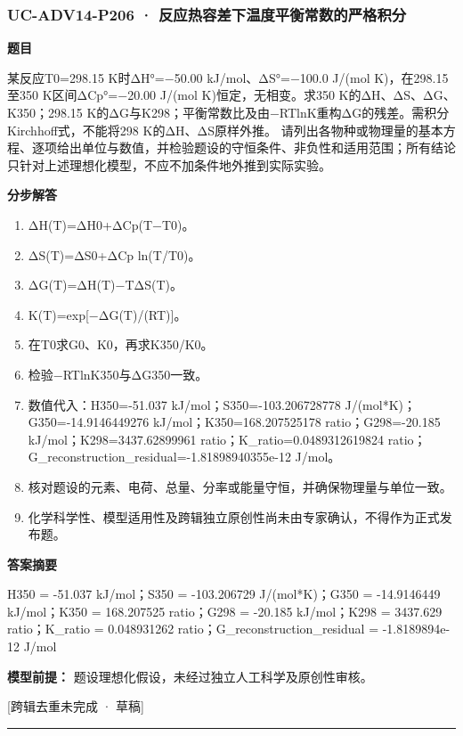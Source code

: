\documentclass[UTF8,11pt,a4paper]{ctexart}
\begin{document}
\subsubsection*{UC-ADV14-P206 · 反应热容差下温度平衡常数的严格积分}
\noindent\textbf{题目}\par
某反应T0=298.15 K时ΔH°=−50.00 kJ/mol、ΔS°=−100.0 J/(mol K)，在298.15至350 K区间ΔCp°=−20.00 J/(mol K)恒定，无相变。求350 K的ΔH、ΔS、ΔG、K350；298.15 K的ΔG与K298；平衡常数比及由−RTlnK重构ΔG的残差。需积分Kirchhoff式，不能将298 K的ΔH、ΔS原样外推。 请列出各物种或物理量的基本方程、逐项给出单位与数值，并检验题设的守恒条件、非负性和适用范围；所有结论只针对上述理想化模型，不应不加条件地外推到实际实验。\par
\medskip\noindent\textbf{分步解答}
\begin{enumerate}
\item ΔH(T)=ΔH0+ΔCp(T−T0)。
\item ΔS(T)=ΔS0+ΔCp ln(T/T0)。
\item ΔG(T)=ΔH(T)−TΔS(T)。
\item K(T)=exp[−ΔG(T)/(RT)]。
\item 在T0求G0、K0，再求K350/K0。
\item 检验−RTlnK350与ΔG350一致。
\item 数值代入：H350=-51.037 kJ/mol；S350=-103.206728778 J/(mol*K)；G350=-14.9146449276 kJ/mol；K350=168.207525178 ratio；G298=-20.185 kJ/mol；K298=3437.62899961 ratio；K\_ratio=0.0489312619824 ratio；G\_reconstruction\_residual=-1.81898940355e-12 J/mol。
\item 核对题设的元素、电荷、总量、分率或能量守恒，并确保物理量与单位一致。
\item 化学科学性、模型适用性及跨辑独立原创性尚未由专家确认，不得作为正式发布题。
\end{enumerate}
\noindent\textbf{答案摘要}\par
H350 = -51.037 kJ/mol；S350 = -103.206729 J/(mol*K)；G350 = -14.9146449 kJ/mol；K350 = 168.207525 ratio；G298 = -20.185 kJ/mol；K298 = 3437.629 ratio；K\_ratio = 0.048931262 ratio；G\_reconstruction\_residual = -1.8189894e-12 J/mol\par
\noindent\textbf{模型前提：}
题设理想化假设，未经过独立人工科学及原创性审核。\par
\noindent\textcolor{red!65!black}{[跨辑去重未完成 · 草稿]} \par
\medskip\hrule\medskip
{}
\end{document}
